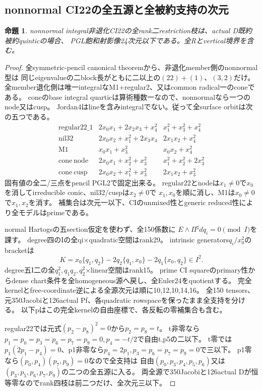 \documentclass[a4paper,11pt]{ltjsarticle}
\newtheorem{proposition}{命題}[section]
\theoremstyle{definition}
\begin{document}
\subsection{nonnormal CI22の全五源と全被約支持の次元}
\begin{proposition}\label{prop:nonnormal-CI22-ranktwo-all-G}
nonnormal integral非退化CI22の全rank二restriction枝は、actual D既約被約quinticの場合、
PGL飽和射影像24次元以下である。全Rとvertical境界を含む。
\end{proposition}
\begin{proof}
全symmetric-pencil canonical theoremから、非退化member側のnonnormal型は
同じeigenvalueの二block長がともに二以上の$(22)+(1)$、$(3,2)$だけ。
全member退化側は唯一integralなM1+regular2、又はcommon radical一のconeである。
coneのbase integral quarticは算術種数一なので、nonnormalなら一つのnode又はcusp。
Jordan4はlineを含みintegralでない。従って全surface orbitは次の五つである。
\[
\begin{array}{c|c|c}
 \mathrm{regular22\_1}&2x_0x_1+2x_2x_3+x_4^2&x_1^2+x_3^2+x_4^2\\
 \mathrm{nil32}&2x_0x_2+x_1^2+2x_3x_4&2x_1x_2+x_4^2\\
 \mathrm{M1}&x_0x_1+x_3^2&x_0x_2+x_4^2\\
 \mathrm{cone\ node}&2x_0x_1+x_2^2+x_3^2&x_1^2+x_2^2+2x_3^2\\
 \mathrm{cone\ cusp}&2x_0x_2+x_1^2+x_3^2&2x_1x_2+x_3^2
\end{array}
\]
固有値の全二/三点をpencil PGL2で固定出来る。
regular22とnodeは$x_1\ne0$で$x_0$を消してirreducible conic、nil32/cuspは$x_2\ne0$で
$x_1,x_0$を順に消し、M1は$x_0\ne0$で$x_1,x_2$を消す。
補集合は次元一以下、CIのunmixed性とgeneric reduced性により全モデルはprimeである。

normal Hartogsの五section仮定を使わず、全150係数に
$E\wedge\Pi^\sharp dq_i=0\pmod I$を課す。
degree四のIの全qi×quadratic空間はrank29。
intrinsic generators$q_i/x_0^2$のbracketは
\[
 K=x_0\{q_1,q_2\}-2q_2\{q_1,x_0\}-2q_1\{x_0,q_2\}\in I^2.
\]
degree五I二の全$q_1^2,q_1q_2,q_2^2$×linear空間はrank15。
prime CI squareのprimary性からdense chart条件を全homogeneous源へ戻し、全Euler24をquotientする。
完全kernelとfree-coordinate逆による全源次元は順に10,12,10,14,16。
全150 tensors、元350Jacobiと126actual Pf、各quadratic rowspaceを保ったまま全支持を分ける。
以下pはこの完全kernelの自由座標で、各反転の零補集合も含む。

regular22では元式$(p_2-p_8)^2=0$から$p_2=p_8=t$。
t非零なら$p_1=p_0=p_3=p_6=p_7=p_9=0,p_4=-t/2$で自由t,p5の二以下。
t零では$p_1(2p_1-p_4)=0$、p1非零なら$p_4=2p_1,p_3=p_6=p_7=p_9=0$で三以下。
p1零なら$(p_0,p_4)(p_7,p_9)=0$なので全支持は
自由$(p_0,p_3,p_4,p_5,p_6)$又は$(p_3,p_5,p_6,p_7,p_9)$の二つの全五源に入る。
両全源で350Jacobiと126actual Dが恒等零なのでrank四枝は前二つだけ、全次元三以下。


\end{proof}
\end{document}

